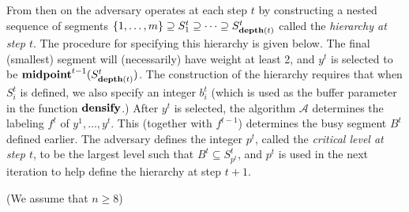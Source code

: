 \documentclass[unicode,review]{siamart1116}
\newcommand{\A}{\mathcal{A}}
\newcommand{\natInt}[2]{ \left\{ #1, \dotsc, #2 \right\} }
\newcommand{\midp}{{\rm {\bf midpoint}}}
\newcommand{\depth}{{\rm {\bf depth}}}
\newcommand{\densify}{{\rm {\bf densify}}}
\numberwithin{theorem}{section}
\begin{document}
From
then on  the adversary operates at each step $t$ by constructing a nested
sequence of segments $\natInt{1}{m} \supseteq S^t_1 \supseteq \dotsb \supseteq S^t_{\depth(t)}$ called the
{\em hierarchy at step $t$}.   The procedure for specifying this hierarchy is given  below. 
The final (smallest) segment will (necessarily) have weight at least 2,
and $y^t$ is selected to be $\midp^{t-1}(S^t_{\depth(t)})$.   The construction of the hierarchy
requires that when $S^t_i$ is defined, we also specify an integer $b^t_i$ (which is used as the
buffer parameter in the function $\densify$.) 
After $y^t$ is selected, the algorithm $\A$ determines the labeling $f^t$ of $y^1,\ldots,y^t$.
This (together with $f^{t-1}$) determines the busy segment $B^t$ defined earlier.
The adversary defines the integer $p^t$, called the {\em critical level at step $t$},
 to be the largest level such that  $B^t \subseteq S^t_{p^t}$, and $p^t$ is used
in the next iteration to help define the hierarchy at step $t+1$.


\medskip\noindent {\bf Adversary($\A,n,m$)} (We assume that $n \geq 8$)
\end{document}
